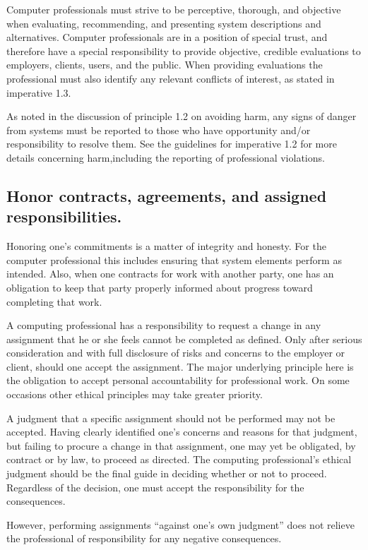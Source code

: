 \documentclass{article}
\begin{document}
Computer professionals must strive to be perceptive, thorough, and objective
when evaluating, recommending, and presenting system descriptions and
alternatives. Computer professionals are in a position of special trust, and
therefore have a special responsibility to provide objective, credible
evaluations to employers, clients, users, and the public. When providing
evaluations the professional must also identify any relevant conflicts of
interest, as stated in imperative 1.3.

As noted in the discussion of principle 1.2 on avoiding harm, any signs of
danger from systems must be reported to those who have opportunity and/or
responsibility to resolve them. See the guidelines for imperative 1.2 for more
details concerning harm,including the reporting of professional violations.

\subsection{Honor contracts, agreements, and assigned responsibilities.}

Honoring one's commitments is a matter of integrity and honesty. For the
computer professional this includes ensuring that system elements perform as
intended. Also, when one contracts for work with another party, one has an
obligation to keep that party properly informed about progress toward
completing that work.

A computing professional has a responsibility to request a change in any
assignment that he or she feels cannot be completed as defined. Only after
serious consideration and with full disclosure of risks and concerns to the
employer or client, should one accept the assignment. The major underlying
principle here is the obligation to accept personal accountability for
professional work. On some occasions other ethical principles may take greater
priority.

A judgment that a specific assignment should not be performed may not be
accepted. Having clearly identified one's concerns and reasons for that
judgment, but failing to procure a change in that assignment, one may yet be
obligated, by contract or by law, to proceed as directed. The computing
professional's ethical judgment should be the final guide in deciding whether
or not to proceed. Regardless of the decision, one must accept the
responsibility for the consequences.

However, performing assignments ``against one's own judgment'' does not relieve
the professional of responsibility for any negative consequences.
\end{document}
